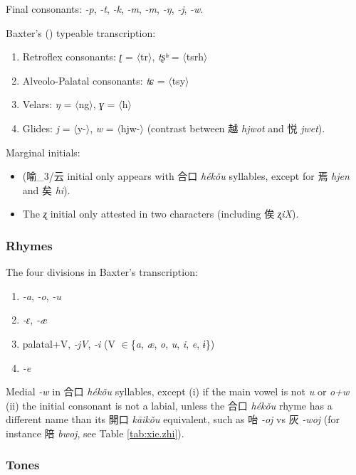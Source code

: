 \documentclass[oneside,a4paper,11pt]{article}
\newcommand{\ipa}[1]{{\phon\textit{#1}}}
\newcommand{\zh}[1]{{\cn #1}}
\newcommand{\zhc}[2]{\zh{#1} \ipa{#2}}
\newcommand{\translit}[1]{$\langle$#1$\rangle$}
\begin{document}
Final consonants: \ipa{-p},  \ipa{-t},  \ipa{-k},  \ipa{-m},  \ipa{-m},  \ipa{-ŋ}, \ipa{-j}, \ipa{-w}.

Baxter's (\citeyear{baxter92}) typeable transcription: 
\begin{enumerate}
\item Retroflex consonants: \ipa{ʈ} = \translit{tr}, \ipa{tʂʰ}  =  \translit{tsrh} 
\item Alveolo-Palatal consonants: \ipa{tɕ} = \translit{tsy}
\item Velars: \ipa{ŋ} = \translit{ng}, \ipa{ɣ} = \translit{h}
\item Glides: \ipa{j} = \translit{y-}, \ipa{w} = \translit{hjw-} (contrast between \zhc{越}{hjwot}  and \zhc{悦}{jwet}).
\end{enumerate}

Marginal initials:
\begin{itemize}
\item 
(\zh{喻}_3/\zh{云} initial only appears with \zhc{合口}{hékǒu} syllables, except for \zhc{焉}{hjen} and \zhc{矣}{hi}).
\item The \ipa{ʐ} initial only attested in two characters (including \zhc{俟}{ʐiX}).
\end{itemize}

\subsubsection{Rhymes} \label{sec:rhymes}

The four divisions in Baxter's transcription:
\begin{enumerate}
\item \ipa{-a}, \ipa{-o}, \ipa{-u}
\item \ipa{-ɛ}, \ipa{-æ}
\item palatal+V, \ipa{-jV}, \ipa{-i} (V $\in$\{\ipa{a}, \ipa{æ}, \ipa{o}, \ipa{u},  \ipa{i}, \ipa{e}, \ipa{ɨ}\})
\item \ipa{-e}
\end{enumerate}

Medial \ipa{-w} in \zhc{合口}{hékǒu} syllables, except (i) if the main vowel is not \ipa{u} or \ipa{o+w} (ii) the initial consonant is not a labial, unless the \zhc{合口}{hékǒu} rhyme has a different name than its \zhc{開口}{kāikǒu} equivalent, such as \zhc{咍}{-oj} vs \zhc{灰}{-woj} (for instance \zhc{陪}{bwoj}, see Table \ref{tab:xie.zhi}).

\subsubsection{Tones}
\end{document}
